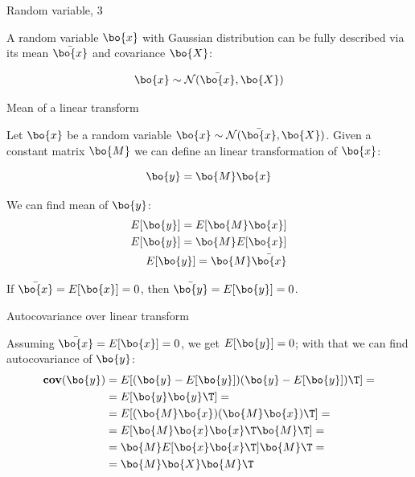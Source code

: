 \documentclass{beamer}
\begin{document}
\begin{frame}{Random variable, 3}
	\begin{flushleft}
		
		A random variable $\bo{x}$ with Gaussian distribution can be fully described via its mean $\bar{\bo{x}}$ and covariance $\bo{X}$:
		
		\begin{equation}
			\bo{x} \sim \mathcal{N} (\bar{\bo{x}}, \bo{X})
		\end{equation}
	
		
	\end{flushleft}
\end{frame}




\begin{frame}{Mean of a linear transform}
	\begin{flushleft}
		
		Let $\bo{x}$ be a random variable $\bo{x} \sim \mathcal{N} (\bar{\bo{x}}, \bo{X})$.  Given a constant matrix $\bo{M}$ we can define an linear transformation of $\bo{x}$:
		
		\begin{equation}
			\bo{y} = \bo{M}\bo{x}
		\end{equation}
		
		We can find mean of $\bo{y}$:
		\begin{align}
			E[\bo{y}] = E[\bo{M}\bo{x}] \\
			E[\bo{y}] = \bo{M}E[\bo{x}] \\
			E[\bo{y}] = \bo{M}\bar{\bo{x}}
		\end{align}
		
		If $\bar{\bo{x}} = E[\bo{x}] = 0$, then $\bar{\bo{y}} = E[\bo{y}] = 0$.
		
	\end{flushleft}
\end{frame}



\begin{frame}{Autocovariance over linear transform}
	\begin{flushleft}
		
		Assuming $\bar{\bo{x}} = E[\bo{x}] = 0$, we get $E[\bo{y}] = 0$; with that we can find autocovariance of $\bo{y}$:
		\begin{align*}
			\textbf{cov}(\bo{y}) &= E[(\bo{y} - E[\bo{y}])(\bo{y} - E[\bo{y}])\T] =
			\\
			&=E[\bo{y}\bo{y}\T] =
			\\
			&=E[(\bo{M}\bo{x})(\bo{M}\bo{x})\T]=
			\\
			&=E[\bo{M}\bo{x}\bo{x}\T \bo{M}\T]=
			\\
			&=\bo{M}E[\bo{x}\bo{x}\T ]\bo{M}\T=
			\\
			&=\bo{M}\bo{X} \bo{M}\T
		\end{align*}
		
	\end{flushleft}
\end{frame}
\end{document}

